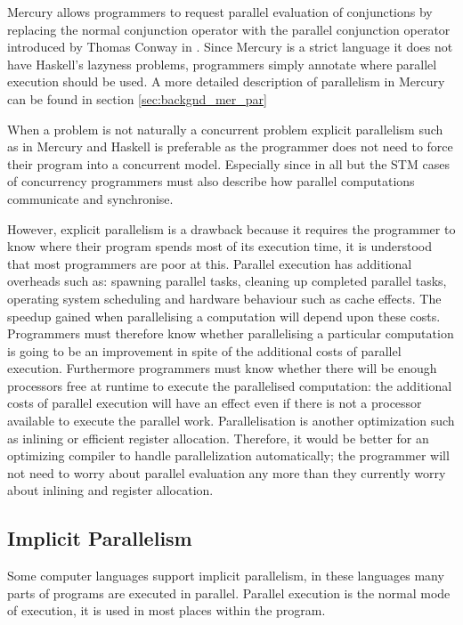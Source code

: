 \label{ref:parallel_conjunction}
Mercury allows programmers to request parallel evaluation of
conjunctions by replacing the normal conjunction operator with the
parallel conjunction operator introduced by Thomas Conway in
\citep{conway:2002:par,wang_hons_thesis,wang_dep_par_conj}.
Since Mercury is a strict language it does not have Haskell's
lazyness problems,
programmers simply annotate where parallel execution
should be used.
A more detailed description of parallelism in Mercury can be found in
section \ref{sec:backgnd_mer_par}

When a problem is not naturally a concurrent problem 
explicit parallelism such as in Mercury and Haskell
is preferable as the programmer does not need to force their program
into a concurrent model.
Especially since in all but the STM cases of concurrency programmers
must also describe how parallel computations communicate and
synchronise.

However, explicit parallelism is a drawback because it requires the
programmer to know where their program spends most of its execution
time, it is understood that most programmers are poor at this.
Parallel execution has additional overheads such as:
spawning parallel tasks,
cleaning up completed parallel tasks,
operating system scheduling and
hardware behaviour such as cache effects.
The speedup gained when parallelising a computation will depend upon
these costs.
Programmers must therefore know whether parallelising a particular
computation is going to be an improvement in spite of the additional
costs of parallel execution.
Furthermore programmers must know whether there will be enough
processors free at runtime to execute the parallelised computation:
the additional costs of parallel execution will have an effect even
if there is not a processor available to execute the parallel work.
Parallelisation is another optimization such as inlining or efficient
register allocation.
Therefore,
it would be better for an optimizing compiler to handle parallelization
automatically;
the programmer will not need to worry about parallel evaluation any more
than they currently worry about inlining and register allocation.

\subsection{Implicit Parallelism}
\label{sec:lit_implicit-parallelism}

Some computer languages support implicit parallelism,
in these languages many parts of programs are executed in parallel.
Parallel execution is the normal mode of execution,
it is used in most places within the program.

